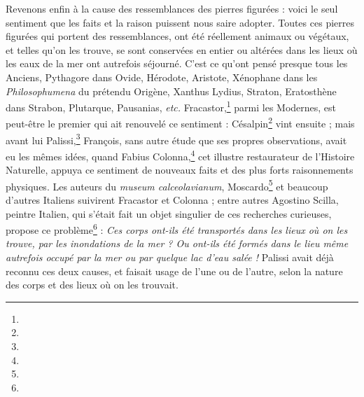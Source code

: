 \documentclass[a4paper, 11pt, oneside, polutonikogreek, french]{article}
\begin{document}
Revenons enfin à la cause des ressemblances des pierres figurées : voici le seul sentiment que les faits et la raison puissent nous saire adopter. Toutes ces pierres figurées qui portent des ressemblances, ont été réellement animaux ou végétaux, et telles qu'on les trouve, se sont conservées en entier ou altérées dans les lieux où les eaux de la mer ont autrefois séjourné. C'est ce qu'ont pensé presque tous les Anciens, Pythagore dans Ovide, Hérodote, Aristote, Xénophane dans les \emph{Philosophumena} du prétendu Origène, Xanthus Lydius, Straton, Eratosthène dans Strabon, Plutarque, Pausanias, \emph{etc.} Fracastor,\footnote{} parmi les Modernes, est peut-être le premier qui ait renouvelé ce sentiment : Césalpin\footnote{} vint ensuite ; mais avant lui Palissi,\footnote{} François, sans autre étude que ses propres observations, avait eu les mêmes idées, quand Fabius Colonna,\footnote{} cet illustre restaurateur de l'Histoire Naturelle, appuya ce sentiment de nouveaux faits et des plus forts raisonnements physiques. Les auteurs du \emph{museum calceolavianum}, Moscardo\footnote{} et beaucoup d'autres Italiens suivirent Fracastor et Colonna ; entre autres Agostino Scilla, peintre Italien, qui s'était fait un objet singulier de ces recherches curieuses, propose ce problème\footnote{} : \emph{Ces corps ont-ils été transportés dans les lieux où on les trouve, par les inondations de la mer ? Ou ont-ils été formés dans le lieu même autrefois occupé par la mer ou par quelque lac d'eau salée !} Palissi avait déjà reconnu ces deux causes, et faisait usage de l'une ou de l'autre, selon la nature des corps et des lieux où on les trouvait.
\end{document}
